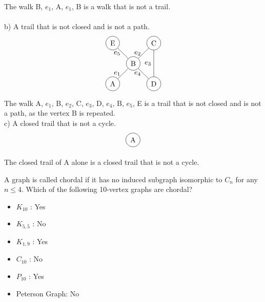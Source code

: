 \documentclass[12pt]{article}
\newenvironment{question}[2][Question]{\begin{trivlist}
\item[\hskip \labelsep {\bfseries #1}\hskip \labelsep {\bfseries #2.}]}{\end{trivlist}}
\begin{document}
The walk B, $e_1$, A, $e_1$, B is a walk that is not a trail. \\ \\
b) A trail that is not closed and is not a path. \\
\begin{align*}
\begin{tikzpicture}
    \node[shape=circle,draw=black] (A) at (0,0) {A};
    \node[shape=circle,draw=black] (B) at (1,1) {B};
    \node[shape=circle,draw=black] (C) at (2,2) {C};
    \node[shape=circle,draw=black] (D) at (2,0) {D};
    \node[shape=circle,draw=black] (E) at (0,2) {E};
    \path [] (A) edge node[left] {$e_1$} (B);
    \path [] (B) edge node[left] {$e_2$} (C);
    \path [] (C) edge node[left] {$e_3$} (D);
    \path [] (D) edge node[left] {$e_4$} (B);
    \path [] (B) edge node[left] {$e_5$} (E);
\end{tikzpicture}
\end{align*}
The walk A, $e_1$, B, $e_2$, C, $e_3$, D, $e_4$, B, $e_5$, E is a trail that is not closed and is not a path, as the vertex B is repeated. \\

c) A closed trail that is not a cycle. \\
\begin{align*}
\begin{tikzpicture}
    \node[shape=circle,draw=black] (A) at (0,0) {A};
\end{tikzpicture}
\end{align*}

The closed trail of A alone is a closed trail that is not a cycle. \\

\begin{question}{7}
A graph is called chordal if it has no induced subgraph isomorphic to $C_{n}$ for any $n \leq 4$. Which of the following 10-vertex graphs are chordal?
\end{question}

\begin{itemize}
\item $K_{10}$ \hspace{3mm}: Yes
\item $K_{5,5}$ \hspace{2mm}: No
\item $K_{1,9}$ \hspace{2mm}: Yes
\item $C_{10}$ \hspace{3mm}: No
\item $P_{10}$ \hspace{3mm}: Yes
\item Peterson Graph: No
\end{itemize}
\end{document}
